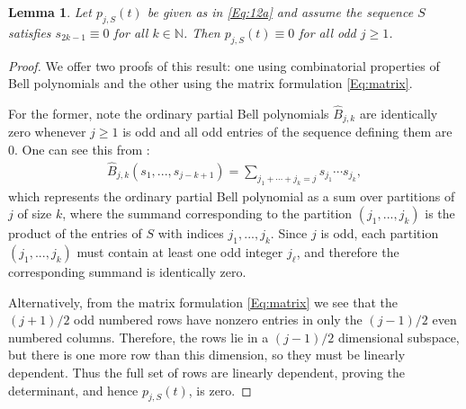 \documentclass[letterpaper,10pt]{amsart}
\newtheorem{lem}[thm]{Lemma}
\numberwithin{equation}{section}
\begin{document}
\begin{lem}\label{Lem:Pjident}
Let $p_{j,S}(t)$ be given as in \eqref{Eq:12a} and assume the sequence $S$ satisfies $s_{2k-1}\equiv0$ for all $k\in\mathbb{N}$. Then $p_{j,S}(t)\equiv0$ for all odd $j\geq1$.
\end{lem}
\begin{proof}
We offer two proofs of this result: one using combinatorial properties of Bell polynomials and the other using the matrix formulation \eqref{Eq:matrix}.

For the former, note the ordinary partial Bell polynomials $\widehat{B}_{j,k}$ are identically zero whenever $j\geq1$ is odd and all odd entries of the sequence defining them are 0. One can see this from \cite[Eq. (2.4)]{OS22}:
\begin{align}\label{Eq:BellEq}
    \widehat{B}_{j,k}(s_1,...,s_{j-k+1}) = \sum_{j_1+\cdots+j_k=j}s_{j_1}\cdots s_{j_k},
\end{align}
which represents the ordinary partial Bell polynomial as a sum over partitions of $j$ of size $k$, where the summand corresponding to the partition $(j_1,...,j_k)$ is the product of the entries of $S$ with indices $j_1,...,j_k$. Since $j$ is odd, each partition $(j_1,...,j_k)$ must contain at least one odd integer $j_\ell$, and therefore the corresponding summand is identically zero.

Alternatively, from the matrix formulation \eqref{Eq:matrix} we see that the $(j+1)/2$ odd numbered rows have nonzero entries in only the $(j-1)/2$ even numbered columns. Therefore, the rows lie in a $(j-1)/2$ dimensional subspace, but there is one more row than this dimension, so they must be linearly dependent. Thus the full set of rows are linearly dependent, proving the determinant, and hence $p_{j,S}(t)$, is zero.
\end{proof}
\end{document}
